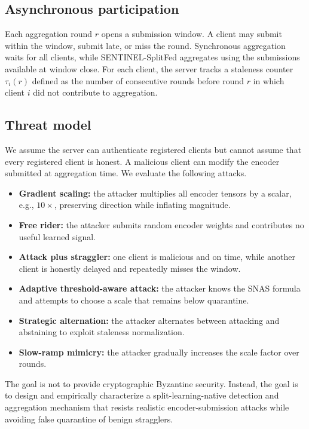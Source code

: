 \documentclass[pdflatex,sn-mathphys-num]{sn-jnl}
\begin{document}
\subsection{Asynchronous participation}

Each aggregation round $r$ opens a submission window. A client may submit within the window, submit late, or miss the round. Synchronous aggregation waits for all clients, while SENTINEL-SplitFed aggregates using the submissions available at window close. For each client, the server tracks a staleness counter $\tau_i(r)$ defined as the number of consecutive rounds before round $r$ in which client $i$ did not contribute to aggregation.

\subsection{Threat model}

We assume the server can authenticate registered clients but cannot assume that every registered client is honest. A malicious client can modify the encoder submitted at aggregation time. We evaluate the following attacks.
\begin{itemize}
    \item \textbf{Gradient scaling:} the attacker multiplies all encoder tensors by a scalar, e.g., $10\times$, preserving direction while inflating magnitude.
    \item \textbf{Free rider:} the attacker submits random encoder weights and contributes no useful learned signal.
    \item \textbf{Attack plus straggler:} one client is malicious and on time, while another client is honestly delayed and repeatedly misses the window.
    \item \textbf{Adaptive threshold-aware attack:} the attacker knows the SNAS formula and attempts to choose a scale that remains below quarantine.
    \item \textbf{Strategic alternation:} the attacker alternates between attacking and abstaining to exploit staleness normalization.
    \item \textbf{Slow-ramp mimicry:} the attacker gradually increases the scale factor over rounds.
\end{itemize}

The goal is not to provide cryptographic Byzantine security. Instead, the goal is to design and empirically characterize a split-learning-native detection and aggregation mechanism that resists realistic encoder-submission attacks while avoiding false quarantine of benign stragglers.
\end{document}
